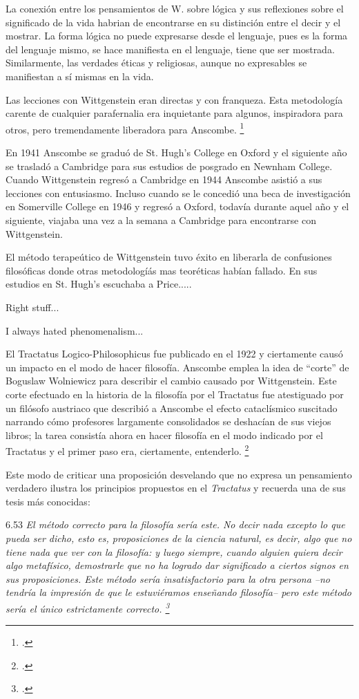 \documentclass[../main.tex]{subfiles}
\begin{document}
La conexión entre los pensamientos de W. sobre lógica y sus reflexiones sobre el significado de la vida habrian de encontrarse en su distinción entre el decir y el mostrar. La forma lógica no puede expresarse desde el lenguaje, pues es la forma del lenguaje mismo, se hace manifiesta en el lenguaje, tiene que ser mostrada. Similarmente, las verdades éticas y religiosas, aunque no expresables se manifiestan a sí mismas en la vida. 

Las lecciones con Wittgenstein eran directas y con franqueza. Esta metodología carente de cualquier parafernalia era inquietante para algunos, inspiradora para otros, pero tremendamente liberadora para Anscombe. \footcite[loc 9853 Chapter 4, Section 24, para. 5]{monk}

En 1941 Anscombe se graduó de St. Hugh's College en Oxford y el siguiente año se trasladó a Cambridge para sus estudios de posgrado en Newnham College. Cuando Wittgenstein regresó a Cambridge en 1944 Anscombe asistió a sus lecciones con entusiasmo. Incluso cuando se le concedió una beca de investigación en Somerville College en 1946 y regresó a Oxford, todavía durante aquel año y el siguiente, viajaba una vez a la semana a Cambridge para encontrarse con Wittgenstein.  

El método terapeútico de Wittgenstein tuvo éxito en liberarla de confusiones filosóficas donde otras metodologíás mas teoréticas habían fallado. En sus estudios en St. Hugh's escuchaba a Price.....

Right stuff...

I always hated phenomenalism...


El Tractatus Logico-Philosophicus fue publicado en el 1922 y ciertamente causó un impacto en el modo de hacer filosofía. Anscombe emplea la idea de ``corte'' de Boguslaw Wolniewicz para describir el cambio causado por Wittgenstein. Este corte efectuado en la historia de la filosofía por el Tractatus fue atestiguado por un filósofo austriaco que describió a Anscombe el efecto cataclísmico suscitado narrando cómo profesores largamente consolidados se deshacían de sus viejos libros; la tarea consistía ahora en hacer filosofía en el modo indicado por el Tractatus y el primer paso era, ciertamente, entenderlo. \footcite[p.181]{twocuts} 

Este modo de criticar una proposición desvelando que no expresa un pensamiento verdadero ilustra los principios propuestos en el \emph{Tractatus} y recuerda una de sus tesis más conocidas: 

6.53 \emph{El método correcto para la filosofía sería este. No decir nada excepto lo que pueda ser dicho, esto es, proposiciones de la ciencia natural, es decir, algo que no tiene nada que ver con la filosofía: y luego siempre, cuando alguien quiera decir algo metafísico, demostrarle que no ha logrado dar significado a ciertos signos en sus proposiciones. Este método sería insatisfactorio para la otra persona --no tendría la impresión de que le estuviéramos enseñando filosofía-- pero este método sería el único estrictamente correcto. \footcite[p. 107--108]{tractatus}}
\end{document}
